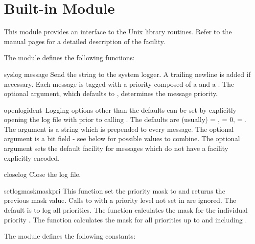 \section{Built-in Module }

This module provides an interface to the Unix  library
routines.  Refer to the \UNIX{} manual pages for a detailed description
of the  facility.

The module defines the following functions:

\begin{funcdesc}{syslog}{ message}
Send the string  to the system logger.
A trailing newline is added if necessary.
Each message is tagged with a priority composed of a  and
a .
The optional  argument, which defaults to
, determines the message priority.
\end{funcdesc}

\begin{funcdesc}{openlog}{ident\, }
Logging options other than the defaults can be set by explicitly opening
the log file with  prior to calling .
The defaults are (usually)  = ,  = 0,
 = .
The  argument is a string which is prepended to every message.
The optional  argument is a bit field - see below for possible
values to combine.
The optional  argument sets the default facility for messages
which do not have a facility explicitly encoded.
\end{funcdesc}

\begin{funcdesc}{closelog}{}
Close the log file.
\end{funcdesc}

\begin{funcdesc}{setlogmask}{maskpri}
This function set the priority mask to  and returns the
previous mask value.
Calls to  with a priority level not set in 
are ignored.
The default is to log all priorities.
The function  calculates the mask for the
individual priority .
The function  calculates the mask for all priorities
up to and including .
\end{funcdesc}

The module defines the following constants:

